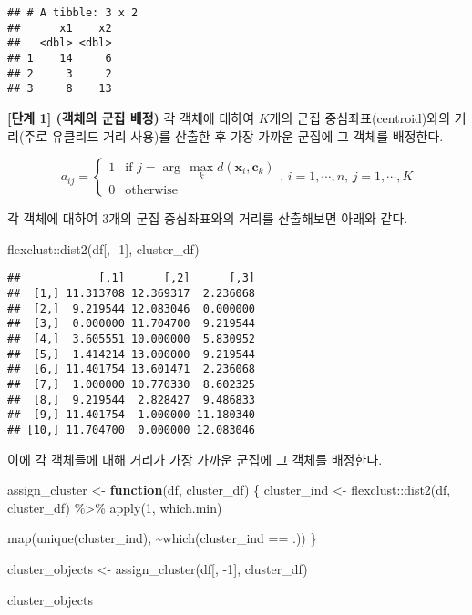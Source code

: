 \documentclass[
]{book}
\newenvironment{Shaded}{\begin{snugshade}}{\end{snugshade}}
\newcommand{\ControlFlowTok}[1]{\textcolor[rgb]{0.13,0.29,0.53}{\textbf{#1}}}
\newcommand{\DecValTok}[1]{\textcolor[rgb]{0.00,0.00,0.81}{#1}}
\newcommand{\FunctionTok}[1]{\textcolor[rgb]{0.00,0.00,0.00}{#1}}
\newcommand{\NormalTok}[1]{#1}
\newcommand{\OtherTok}[1]{\textcolor[rgb]{0.56,0.35,0.01}{#1}}
\newcommand{\SpecialCharTok}[1]{\textcolor[rgb]{0.00,0.00,0.00}{#1}}
\begin{document}
\begin{verbatim}
## # A tibble: 3 x 2
##      x1    x2
##   <dbl> <dbl>
## 1    14     6
## 2     3     2
## 3     8    13
\end{verbatim}

\textbf{{[}단계 1{]} (객체의 군집 배정)} 각 객체에 대하여 \(K\)개의 군집 중심좌표(centroid)와의 거리(주로 유클리드 거리 사용)를 산출한 후 가장 가까운 군집에 그 객체를 배정한다.

\begin{equation*}
a_{ij} = \begin{cases}
1 & \text{if } j = \arg\,\max_k d(\mathbf{x}_i, \mathbf{c}_k)\\
0 & \text{otherwise}
\end{cases}, \, i = 1, \cdots, n, \, j = 1, \cdots, K
\end{equation*}

각 객체에 대하여 3개의 군집 중심좌표와의 거리를 산출해보면 아래와 같다.

\begin{Shaded}
\begin{Highlighting}[]
\NormalTok{flexclust}\SpecialCharTok{::}\FunctionTok{dist2}\NormalTok{(df[, }\SpecialCharTok{{-}}\DecValTok{1}\NormalTok{], cluster\_df)}
\end{Highlighting}
\end{Shaded}

\begin{verbatim}
##            [,1]      [,2]      [,3]
##  [1,] 11.313708 12.369317  2.236068
##  [2,]  9.219544 12.083046  0.000000
##  [3,]  0.000000 11.704700  9.219544
##  [4,]  3.605551 10.000000  5.830952
##  [5,]  1.414214 13.000000  9.219544
##  [6,] 11.401754 13.601471  2.236068
##  [7,]  1.000000 10.770330  8.602325
##  [8,]  9.219544  2.828427  9.486833
##  [9,] 11.401754  1.000000 11.180340
## [10,] 11.704700  0.000000 12.083046
\end{verbatim}

이에 각 객체들에 대해 거리가 가장 가까운 군집에 그 객체를 배정한다.

\begin{Shaded}
\begin{Highlighting}[]
\NormalTok{assign\_cluster }\OtherTok{\textless{}{-}} \ControlFlowTok{function}\NormalTok{(df, cluster\_df) \{}
\NormalTok{  cluster\_ind }\OtherTok{\textless{}{-}}\NormalTok{ flexclust}\SpecialCharTok{::}\FunctionTok{dist2}\NormalTok{(df, cluster\_df) }\SpecialCharTok{\%\textgreater{}\%}
    \FunctionTok{apply}\NormalTok{(}\DecValTok{1}\NormalTok{, which.min)}
  
  \FunctionTok{map}\NormalTok{(}\FunctionTok{unique}\NormalTok{(cluster\_ind), }\SpecialCharTok{\textasciitilde{}}\FunctionTok{which}\NormalTok{(cluster\_ind }\SpecialCharTok{==}\NormalTok{ .))}
\NormalTok{\}}

\NormalTok{cluster\_objects }\OtherTok{\textless{}{-}} \FunctionTok{assign\_cluster}\NormalTok{(df[, }\SpecialCharTok{{-}}\DecValTok{1}\NormalTok{], cluster\_df)}

\NormalTok{cluster\_objects}
\end{Highlighting}
\end{Shaded}
\end{document}
